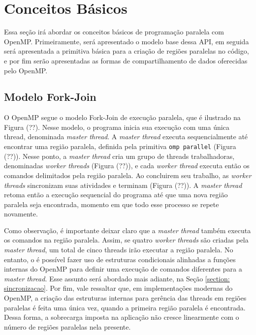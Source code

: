 \documentclass{SBCbookchapter}
\begin{document}
\section{Conceitos Básicos}

	Essa seção irá abordar os conceitos básicos de programação paralela com
	OpenMP. Primeiramente, será apresentado o modelo base dessa API, em
	seguida será apresentada a primitiva básica para a criação de regiões
	paralelas no código, e por fim serão apresentadas as formas de
	compartilhamento de dados oferecidas pelo OpenMP.

	\subsection{Modelo Fork-Join}

		O OpenMP segue o modelo Fork-Join de execução paralela, que é
		ilustrado na Figura (??). Nesse modelo, o programa inicia sua
		execução com uma única thread, denominada \textit{master thread}. A
		\textit{master thread} executa sequencialmente até encontrar uma
		região paralela, definida pela primitiva \texttt{omp parallel}
		(Figura (??)). Nesse ponto, a \textit{master thread} cria um grupo
		de threads trabalhadoras, denominadas \textit{worker threads}
		(Figura (??)), e cada \textit{worker thread} executa então os
		comandos delimitados pela região paralela. Ao concluirem seu
		trabalho, as \textit{worker threads} sincronizam suas atividades e
		terminam (Figura (??)). A \textit{master thread} retoma então a
		execução sequencial do programa até que uma nova região paralela
		seja encontrada, momento em que todo esse processo se repete
		novamente.
		
		Como observação, é importante deixar claro que a \textit{master
		thread} também executa os comandos na região paralela. Assim, se
		quatro \textit{worker threads} são criadas pela \textit{master
		thread}, um total de cinco threads irão executar a região paralela.
		No entanto, o é possível fazer uso de estruturas condicionais
		alinhadas a funções internas do OpenMP para definir uma execução de
		comandos diferentes para a \textit{master thread}. Esse assunto será
		abordado mais adiante, na Seção \ref{section: sincronizacao}. Por
		fim, vale ressaltar que, em implementações modernas do OpenMP, a
		criação das estruturas internas para gerência das threads em regiões
		paralelas é feita uma única vez, quando a primeira região paralela é
		encontrada. Dessa forma, a sobrecarga imposta na aplicação não
		cresce linearmente com o número de regiões paralelas nela presente.
\end{document}
